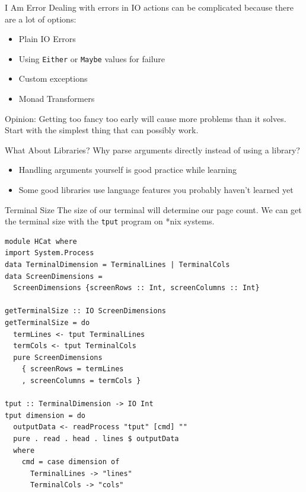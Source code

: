\documentclass[10pt, presentation, colorlinks]{beamer}
\begin{document}
\begin{frame}[label={sec:org687e158},fragile]{I Am Error}
 Dealing with errors in IO actions can be complicated because there are a lot of options:

\bigskip
\pause

\begin{itemize}
\item Plain IO Errors
\item Using \texttt{Either} or \texttt{Maybe} values for failure
\item Custom exceptions
\item Monad Transformers
\end{itemize}

\bigskip
\pause

\alert{Opinion}: Getting too fancy too early will cause more problems than it solves. Start with the simplest thing that can possibly work.
\end{frame}

\begin{frame}[label={sec:orge4af8e2}]{What About Libraries?}
Why parse arguments directly instead of using a library?

\bigskip
\pause

\begin{itemize}
\item Handling arguments yourself is good practice while learning
\item Some good libraries use language features you probably haven't learned yet
\end{itemize}
\end{frame}

\begin{frame}[label={sec:org33271dc},fragile]{Terminal Size}
 The size of our terminal will determine our page count. We can get the terminal size with the \alert{\texttt{tput}} program on *nix systems.

\pause

\begin{verbatim}
module HCat where
import System.Process
data TerminalDimension = TerminalLines | TerminalCols
data ScreenDimensions =
  ScreenDimensions {screenRows :: Int, screenColumns :: Int}

getTerminalSize :: IO ScreenDimensions
getTerminalSize = do
  termLines <- tput TerminalLines
  termCols <- tput TerminalCols
  pure ScreenDimensions
    { screenRows = termLines
    , screenColumns = termCols }

tput :: TerminalDimension -> IO Int
tput dimension = do
  outputData <- readProcess "tput" [cmd] ""
  pure . read . head . lines $ outputData
  where
    cmd = case dimension of
      TerminalLines -> "lines"
      TerminalCols -> "cols"
\end{verbatim}
\end{frame}
\end{document}
